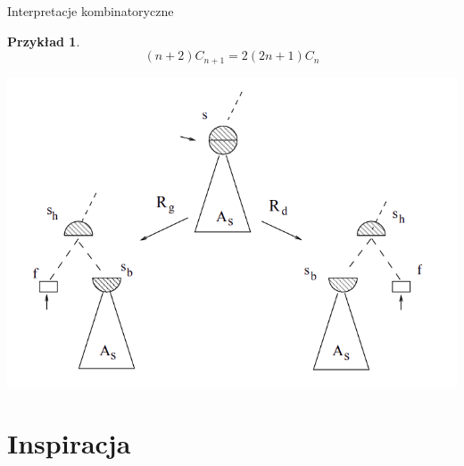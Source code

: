 \documentclass[final]{beamer}
\theoremstyle{bluetheorem}
\theoremstyle{bluetheorem}
\theoremstyle{greentheorem}
\newtheorem{myexample}[mytheorem]{Przykład}
\begin{document}
\begin{frame}{Interpretacje kombinatoryczne}
    \begin{myexample}
        \[(n + 2) C_{n + 1} = 2 (2n + 1) C_{n}\]

        \begin{center}
            \includegraphics{catalan_interpretation.png}
        \end{center}
    \end{myexample}
\end{frame}

\section{Inspiracja}
\end{document}
